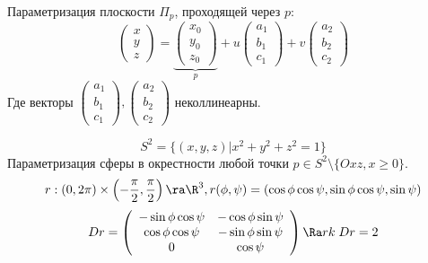 \begin{example}
    Параметризация плоскости \(\Pi_p\), проходящей через \(p\):
    \[\left( \begin{array}{c}
        x \\
        y \\
        z
    \end{array} \right) = \underbrace{\left( \begin{array}{c}
        x_0 \\
        y_0 \\
        z_0
    \end{array} \right)}_p + u\left( \begin{array}{c}
        a_1 \\
        b_1 \\
        c_1
    \end{array} \right) + v\left( \begin{array}{c}
        a_2 \\
        b_2 \\
        c_2
    \end{array} \right)\]
    Где векторы \(\left( \begin{array}{c}
        a_1 \\
        b_1 \\
        c_1
    \end{array} \right), \left( \begin{array}{c}
        a_2 \\
        b_2 \\
        c_2
    \end{array} \right)\) неколлинеарны.
\end{example}

\begin{example}
    \[S^2 = \{(x, y, z) | x^2 + y^2 + z^2 = 1\}\]
    Параметризация сферы в окрестности любой точки \(p \in S^2 \setminus \{Oxz, x \ge 0\}\).
    \[r: (0, 2\pi)\times\left( -\frac{\pi}{2}, \frac{\pi}{2} \right) \ra \R^3, r(\phi, \psi) = (\cos\phi\cos\psi, \sin\phi\cos\psi, \sin\psi)\]
    \[Dr = \left( \begin{array}{cc}
        -\sin\phi\cos\psi & -\cos\phi\sin\psi \\
        \cos\phi\cos\psi & -\sin\phi \sin\psi \\
        0 & \cos\psi \\
    \end{array} \right) \Ra rk\;Dr = 2\]
\end{example}


